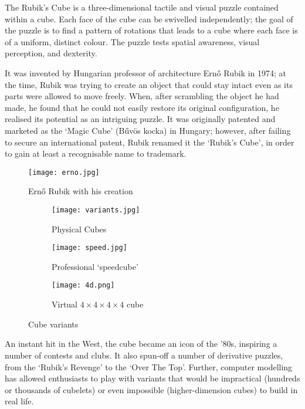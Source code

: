 
The Rubik's Cube is a three-dimensional tactile and visual puzzle contained within a  cube. Each face of the cube can be swivelled independently; the goal of the puzzle is to find a pattern of rotations that leads to a cube where each face is of a uniform, distinct colour. The puzzle tests spatial awareness, visual perception, and dexterity. 
	
	It was invented by Hungarian professor of architecture Ern\H{o} Rubik in 1974; at the time, Rubik was trying to create an object that could stay intact even as its parts were allowed to move freely. When, after scrambling the object he had made, he found that he could not easily restore its original configuration, he realised its potential as an intriguing puzzle. It was originally patented and marketed as the `Magic Cube' (B\H{u}v\"{o}s kocka) in Hungary; however, after failing to secure an international patent, Rubik renamed it the `Rubik's Cube', in order to gain at least a recognisable name to trademark.
\begin{figure}[h]
	\centering
	\texttt{[image: erno.jpg]}
	\caption{Ern\H{o} Rubik with his creation}
\end{figure}
\begin{figure}[h]
	\centering
	\begin{subfigure}[b]{0.3\textwidth}
		\texttt{[image: variants.jpg]}
		\caption{Physical Cubes}
	\end{subfigure}\begin{subfigure}[b]{0.3\textwidth}
		\texttt{[image: speed.jpg]}	
		\caption{Professional `speedcube'}
	\end{subfigure}\begin{subfigure}[b]{0.3\textwidth}
		\texttt{[image: 4d.png]}
		\caption{Virtual $4{\times}4{\times}4{\times}4$  cube}	\end{subfigure}
	\caption{Cube variants}
\end{figure}	\newpage
	 An instant hit in the West, the cube became an icon of the '80s, inspiring a number of contests and clubs. It also spun-off a number of derivative puzzles, from the  `Rubik's Revenge' to the  `Over The Top'. Further, computer modelling has allowed enthusiasts to play with variants that would be impractical (hundreds or thousands of cubelets) or even impossible (higher-dimension cubes) to build in real life.
	
